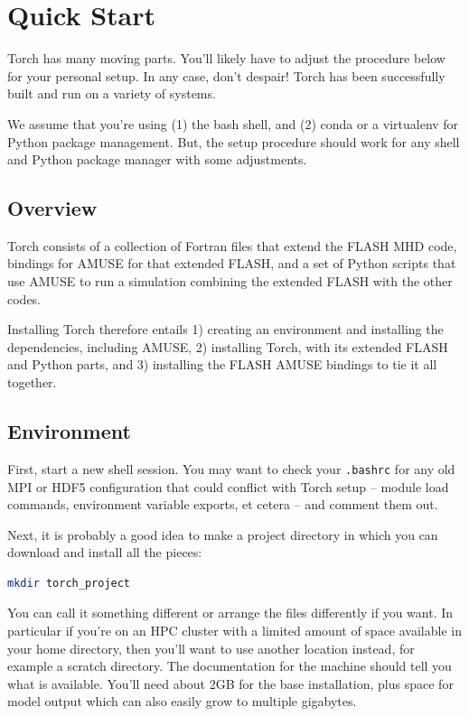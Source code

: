 \documentclass[10pt]{article}
\begin{document}
\section{Quick Start}

Torch has many moving parts.  You'll likely have to adjust the procedure below
for your personal setup.  In any case, don't despair!  Torch has been
successfully built and run on a variety of systems.

We assume that you're using (1) the bash shell, and (2) conda or a virtualenv for Python
package management.  But, the setup procedure should work for any shell and
Python package manager with some adjustments.


\subsection{Overview}

Torch consists of a collection of Fortran files that extend the FLASH MHD code, bindings
for AMUSE for that extended FLASH, and a set of Python scripts that use AMUSE to run a
simulation combining the extended FLASH with the other codes.

Installing Torch therefore entails 1) creating an environment and installing the
dependencies, including AMUSE, 2) installing Torch, with its extended FLASH and Python
parts, and 3) installing the FLASH AMUSE bindings to tie it all together.


\subsection{Environment}

First, start a new shell session. You may want to check your \texttt{.bashrc} for any
old MPI or HDF5 configuration that could conflict with Torch setup -- module
load commands, environment variable exports, et cetera -- and comment them out.

Next, it is probably a good idea to make a project directory in which you can
download and install all the pieces:

\begin{lstlisting}[language=bash]
mkdir torch_project
\end{lstlisting}

You can call it something different or arrange the files differently if you want. In
particular if you're on an HPC cluster with a limited amount of space available in your
home directory, then you'll want to use another location instead, for example a scratch
directory. The documentation for the machine should tell you what is available. You'll
need about 2GB for the base installation, plus space for model output which can also
easily grow to multiple gigabytes.
\end{document}
